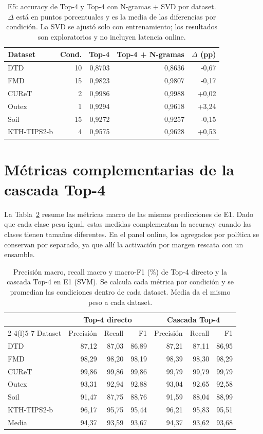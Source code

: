 \documentclass[a4paper,fleqn]{cas-sc}
\begin{document}
\begin{table}[pos=htbp]
\centering
\caption{E5: accuracy de Top-4 y Top-4 con N-gramas + SVD por dataset. $\Delta$ está en puntos porcentuales y es la media de las diferencias por condición. La SVD se ajustó solo con entrenamiento; los resultados son exploratorios y no incluyen latencia online.}
\label{tab:e5-datasets}
\small
\begin{tabular}{@{}lrrrr@{}}
\toprule
Dataset & Cond. & Top-4 & Top-4 + N-gramas & $\Delta$ (pp) \\
\midrule
DTD & 10 & 0,8703 & 0,8636 & -0,67 \\
FMD & 15 & 0,9823 & 0,9807 & -0,17 \\
CUReT & 2 & 0,9986 & 0,9988 & +0,02 \\
Outex & 1 & 0,9294 & 0,9618 & +3,24 \\
Soil & 15 & 0,9272 & 0,9257 & -0,15 \\
KTH-TIPS2-b & 4 & 0,9575 & 0,9628 & +0,53 \\
\bottomrule
\end{tabular}
\end{table}

\FloatBarrier
\section{Métricas complementarias de la cascada Top-4}

La Tabla~\ref{tab:e1-macro} resume las métricas macro de las mismas predicciones de E1. Dado que cada clase pesa igual, estas medidas complementan la accuracy cuando las clases tienen tamaños diferentes. En el panel online, los agregados por política se conservan por separado, ya que allí la activación por margen rescata con un ensamble.

\begin{table}[pos=htbp]
\centering
\caption{Precisión macro, recall macro y macro-F1 (\%) de Top-4 directo y la cascada Top-4 en E1 (SVM). Se calcula cada métrica por condición y se promedian las condiciones dentro de cada dataset. Media da el mismo peso a cada dataset.}
\label{tab:e1-macro}
\small
\begin{tabular}{@{}lrrrrrr@{}}
\toprule
 & \multicolumn{3}{c}{Top-4 directo} & \multicolumn{3}{c}{Cascada Top-4} \\
\cmidrule(lr){2-4}\cmidrule(l){5-7}
Dataset & Precisión & Recall & F1 & Precisión & Recall & F1 \\
\midrule
DTD & 87,12 & 87,03 & 86,89 & 87,21 & 87,11 & 86,95 \\
FMD & 98,29 & 98,20 & 98,19 & 98,39 & 98,30 & 98,29 \\
CUReT & 99,86 & 99,86 & 99,86 & 99,79 & 99,79 & 99,79 \\
Outex & 93,31 & 92,94 & 92,88 & 93,04 & 92,65 & 92,58 \\
Soil & 91,47 & 87,75 & 88,76 & 91,59 & 88,04 & 88,99 \\
KTH-TIPS2-b & 96,17 & 95,75 & 95,44 & 96,21 & 95,83 & 95,51 \\
\midrule
Media & 94,37 & 93,59 & 93,67 & 94,37 & 93,62 & 93,68 \\
\bottomrule
\end{tabular}
\end{table}
\FloatBarrier
\end{document}
